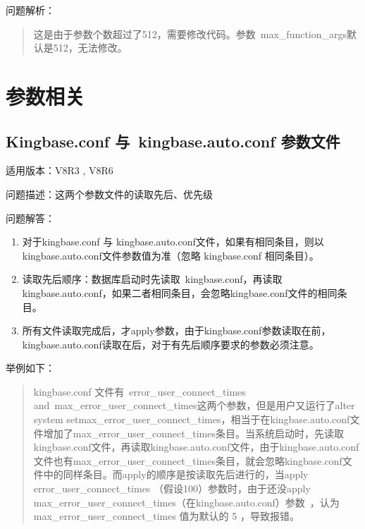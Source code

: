 \documentclass[letterpaper,10pt,english]{sphinxmanual}
\begin{document}
问题解析：
\begin{quote}

这是由于参数个数超过了512，需要修改代码。参数 max\_function\_args默认是512，无法修改。
\end{quote}


\chapter{参数相关}
\label{\detokenize{parameter:id1}}\label{\detokenize{parameter::doc}}

\section{Kingbase.conf 与 kingbase.auto.conf 参数文件}
\label{\detokenize{parameter:kingbase-conf-kingbase-auto-conf}}
适用版本：V8R3 , V8R6

问题描述：这两个参数文件的读取先后、优先级

问题解答：
\begin{enumerate}
%
\item {} 
对于kingbase.conf 与 kingbase.auto.conf文件，如果有相同条目，则以kingbase.auto.conf文件参数值为准（忽略 kingbase.conf 相同条目）。

\item {} 
读取先后顺序：数据库启动时先读取 kingbase.conf，再读取kingbase.auto.conf，如果二者相同条目，会忽略kingbase.conf文件的相同条目。

\item {} 
所有文件读取完成后，才apply参数，由于kingbase.conf参数读取在前，kingbase.auto.conf读取在后，对于有先后顺序要求的参数必须注意。

\end{enumerate}

举例如下：
\begin{quote}

kingbase.conf 文件有 error\_user\_connect\_times and max\_error\_user\_connect\_times这两个参数，但是用户又运行了alter system setmax\_error\_user\_connect\_times，相当于在kingbase.auto.conf文件增加了max\_error\_user\_connect\_times条目。当系统启动时，先读取kingbase.conf文件，再读取kingbase.auto.conf文件，由于kingbase.auto.conf文件也有max\_error\_user\_connect\_times条目，就会忽略kingbase.conf文件中的同样条目。而apply的顺序是按读取先后进行的，当apply error\_user\_connect\_times （假设100）参数时，由于还没apply max\_error\_user\_connect\_times（在kingbase.auto.conf）参数 ，认为 max\_error\_user\_connect\_times 值为默认的 5 ，导致报错。
\end{quote}
\end{document}

